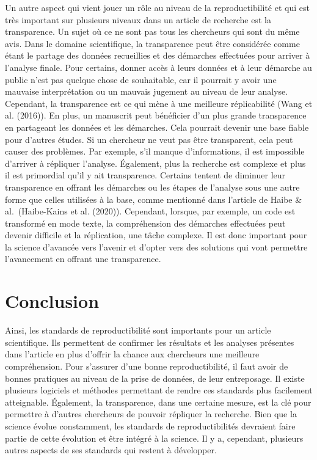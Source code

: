 \documentclass[9pt,twocolumn,twoside,]{pnas-new}
\begin{document}
Un autre aspect qui vient jouer un rôle au niveau de la reproductibilité
et qui est très important sur plusieurs niveaux dans un article de
recherche est la transparence. Un sujet où ce ne sont pas tous les
chercheurs qui sont du même avis. Dans le domaine scientifique, la
transparence peut être considérée comme étant le partage des données
recueillies et des démarches effectuées pour arriver à l'analyse finale.
Pour certains, donner accès à leurs données et à leur démarche au public
n'est pas quelque chose de souhaitable, car il pourrait y avoir une
mauvaise interprétation ou un mauvais jugement au niveau de leur
analyse. Cependant, la transparence est ce qui mène à une meilleure
réplicabilité (Wang et al. (2016)). En plus, un manuscrit peut
bénéficier d'un plus grande transparence en partageant les données et
les démarches. Cela pourrait devenir une base fiable pour d'autres
études. Si un chercheur ne veut pas être transparent, cela peut causer
des problèmes. Par exemple, s'il manque d'informations, il est
impossible d'arriver à répliquer l'analyse. Également, plus la recherche
est complexe et plus il est primordial qu'il y ait transparence.
Certains tentent de diminuer leur transparence en offrant les démarches
ou les étapes de l'analyse sous une autre forme que celles utilisées à
la base, comme mentionné dans l'article de Haibe \& al.~(Haibe-Kains et
al. (2020)). Cependant, lorsque, par exemple, un code est transformé en
mode texte, la compréhension des démarches effectuées peut devenir
difficile et la réplication, une tâche complexe. Il est donc important
pour la science d'avancée vers l'avenir et d'opter vers des solutions
qui vont permettre l'avancement en offrant une transparence.

\hypertarget{conclusion}{%
\section{Conclusion}\label{conclusion}}

Ainsi, les standards de reproductibilité sont importants pour un article
scientifique. Ils permettent de confirmer les résultats et les analyses
présentes dans l'article en plus d'offrir la chance aux chercheurs une
meilleure compréhension. Pour s'assurer d'une bonne reproductibilité, il
faut avoir de bonnes pratiques au niveau de la prise de données, de leur
entreposage. Il existe plusieurs logiciels et méthodes permettant de
rendre ces standards plus facilement atteignable. Également, la
transparence, dans une certaine mesure, est la clé pour permettre à
d'autres chercheurs de pouvoir répliquer la recherche. Bien que la
science évolue constamment, les standards de reproductibilités devraient
faire partie de cette évolution et être intégré à la science. Il y a,
cependant, plusieurs autres aspects de ses standards qui restent à
développer.
\end{document}
